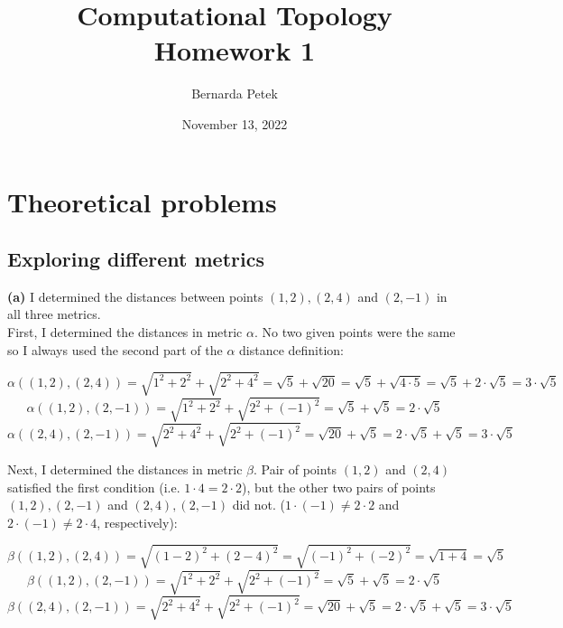 \documentclass[12pt]{article}
\begin{document}
	
	
	
	
	\title{Computational Topology \\ Homework 1}
	\author{%
		Bernarda Petek} %
	
	\date{November 13, 2022}
	\maketitle
	

	
	\section{Theoretical problems}
    \subsection{Exploring different metrics} 
    
    \textbf{(a)} I determined the distances between points $(1,2), (2,4)$ and $(2,-1)$ in all three metrics. \\
    
    \noindent First, I determined the distances in metric $\alpha$. No two given points were the same so I always used the second part of the $\alpha$ distance definition:
    
    $$\alpha((1,2), (2,4)) = \sqrt{1^2 + 2^2} + \sqrt{2^2 + 4^2} = \sqrt{5} + \sqrt{20} = \sqrt{5} + \sqrt{4\cdot5} = \sqrt{5} + 2\cdot\sqrt{5} = 3\cdot\sqrt{5}$$
    $$\alpha((1,2), (2,-1)) = \sqrt{1^2 + 2^2} + \sqrt{2^2 + (-1)^2} = \sqrt{5} + \sqrt{5} = 2\cdot \sqrt{5}$$
    $$\alpha((2,4),(2,-1)) = \sqrt{2^2 + 4^2} + \sqrt{2^2 + (-1)^2} = \sqrt{20} + \sqrt{5} = 2\cdot\sqrt{5} + \sqrt{5} = 3\cdot\sqrt{5}$$
    
    \noindent Next, I determined the distances in metric $\beta$. Pair of points $(1,2)$ and $(2,4)$ satisfied the first condition (i.e. $1\cdot4=2\cdot2$), but the other two pairs of points $(1,2), (2,-1)$ and $(2,4),(2,-1)$ did not. ($1\cdot(-1)\neq2\cdot2$ and $2\cdot(-1)\neq2\cdot4$, respectively):
    
    $$\beta((1,2), (2,4)) = \sqrt{(1-2)^2 + (2-4)^2} = \sqrt{(-1)^2 + (-2)^2} =
    \sqrt{1+4}=\sqrt{5}$$
    $$\beta((1,2), (2,-1)) = \sqrt{1^2 + 2^2} + \sqrt{2^2 + (-1)^2} = \sqrt{5} + \sqrt{5} = 2\cdot \sqrt{5}$$
    $$\beta((2,4),(2,-1)) = \sqrt{2^2 + 4^2} + \sqrt{2^2 + (-1)^2} = \sqrt{20} + \sqrt{5} = 2\cdot\sqrt{5} + \sqrt{5} = 3\cdot\sqrt{5}$$
    
\end{document}
